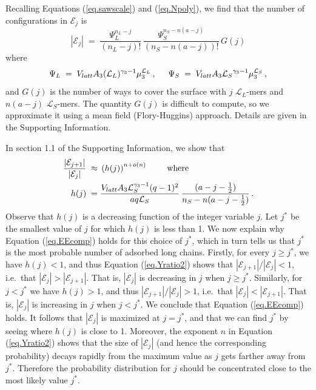 \documentclass[twoside,twocolumn,9pt]{article}
\newcommand{\leng}{\mathcal{L}}
\begin{document}
Recalling Equations (\ref{eq.sawscale}) and 
(\ref{eq.Npoly}), we find that the number of configurations in $\mathcal{E}_j$ is
\begin{equation}
    |\mathcal{E}_j|  
      \; = \; \frac{ \Psi_L^{n_L-j} }{(n_L-j)!} \,
          \frac{ \Psi_S^{n_S-n(a-j)} }{(n_S-n(a-j))!} \,  G(j)
        \label{eq.Yj}
\end{equation}
where 
\begin{equation}
    \label{eq.psidef}   
   \Psi_L\;=\;V_{latt} A_3 (\leng_L)^{\gamma_3-1} \mu_{3}^{\leng_L} \,,  
    \hspace{5mm} %
     \Psi_S \;=\; V_{latt}A_3{\leng_S}^{\gamma_3-1}\mu_3^{\leng_S} \,,
\end{equation}
and $G(j)$ is the number of ways to cover the surface
with $j$ $\leng_L$-mers and $n(a-j)$ $\leng_S$-mers.
The quantity $G(j)$ is difficult to compute, so we
approximate it using a mean field (Flory-Huggins) approach.  Details are given in the Supporting Information.

In section 1.1 of the Supporting Information, we show that
\begin{equation}
    \label{eq.Yratio2}
    \begin{split}
       \frac{|\mathcal{E}_{j+1}|}{|\mathcal{E}_j|} \; \approx \; & \left( h(j)\right)^{n+o(n)}
     \hspace{8mm}\hbox{where}\hspace{5mm}    \\
    h(j)  \;=\; & \frac{ V_{latt}A_3\leng_S^{\gamma_3-1}(q-1)^2}{aq\leng_S} \,
          \frac{(a-j-\frac{1}{2})}{n_S-n(a-j-\frac{1}{2})}   \,.
          \end{split}
\end{equation}
Observe that $h(j)$ is a  decreasing function of the integer variable $j$.
Let $j^*$ be the smallest value of $j$ for which 
$h(j)$ is less than 1. 
We now explain why Equation (\ref{eq.EEcomp}) holds 
for this choice of $j^*$, which in turn tells us that
$j^*$ is the most probable 
number of adsorbed long chains.
Firstly, for every $j\geq j^*$, we have $h(j)<1$, 
and thus Equation (\ref{eq.Yratio2}) shows that 
$|\mathcal{E}_{j+1}|/|\mathcal{E}_j|<1$, i.e.\ that 
$|\mathcal{E}_j|>|\mathcal{E}_{j+1}|$.  That is, $|\mathcal{E}_j|$ is decreasing in $j$ when $j\geq j^*$.  
Similarly, for $j<j^*$ we have $h(j)>1$, and thus
$|\mathcal{E}_{j+1}|/|\mathcal{E}_j|> 1$, i.e.\ that
$|\mathcal{E}_j|<|\mathcal{E}_{j+1}|$.  That is, $|\mathcal{E}_j|$ is increasing in $j$ when $j< j^*$.
We conclude that Equation (\ref{eq.EEcomp}) holds.
It follows that $|\mathcal{E}_j|$ is maximized at $j=j^*$, and that we can find $j^*$ by seeing 
where $h(j)$
is close to 1.   
Moreover, the exponent $n$ in Equation (\ref{eq.Yratio2})
shows that the size of $|\mathcal{E}_j|$ (and hence the 
corresponding probability) decays rapidly from the maximum 
value as $j$ gets farther away from $j^*$.  Therefore the probability distribution for $j$ should be concentrated close to the most likely value $j^*$.
\end{document}
